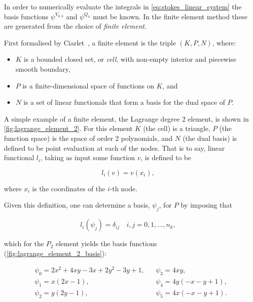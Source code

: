 \documentclass[thesis]{subfiles}
\begin{document}
In order to numerically evaluate the integrals in \cref{eq:stokes_linear_system} the basis functions $\psi^{V_{0,h}}$ and $\psi^{Q_h}$ must be known.
In the finite element method these are generated from the choice of \textit{finite element}.

First formalised by Ciarlet~\parencite{ciarletElement2002}, a finite element is the triple $(K, P, N)$, where:

\begin{itemize}
  \item $K$ is a bounded closed set, or \textit{cell}, with non-empty interior and piecewise smooth boundary,
  \item $P$ is a finite-dimensional space of functions on $K$, and
  \item $N$ is a set of linear functionals that form a basis for the dual space of $P$.
\end{itemize}

A simple example of a finite element, the Lagrange degree 2 element, is shown in \cref{fig:lagrange_element_2}.
For this element $K$ (the cell) is a triangle, $P$ (the function space) is the space of order 2 polynomials, and $N$ (the dual basis) is defined to be point evaluation at each of the nodes.
That is to say, linear functional $l_i$, taking as input some function $v$, is defined to be

\begin{equation*}
  l_i(v) = v(x_i),
\end{equation*}

\noindent
where $x_i$ is the coordinates of the $i$-th node.

Given this definition, one can determine a basis, $\psi_j$, for $P$ by imposing that


\begin{equation*}
  l_i(\psi_j) = \delta_{ij} \quad i, j = 0, 1, \dots, n_k,
\end{equation*}

\noindent
which for the $P_2$ element yields the basis functions (\cref{fig:lagrange_element_2_basis}):

\begin{align}
  &\psi_0 = 2x^2 + 4xy - 3x + 2y^2-3y+1,
  &
  &\psi_3 = 4xy, \\
  &\psi_1 = x(2x-1),
  &
  &\psi_4 = 4y(-x-y+1), \\
  &\psi_2 = y(2y-1),
  &
  &\psi_5 = 4x(-x-y+1).
  \label{eq:basis_functions}
\end{align}
\end{document}
